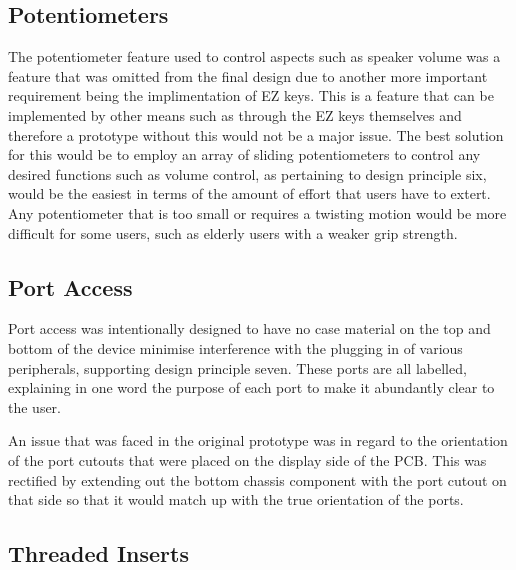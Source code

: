 \subsection{Potentiometers}

The potentiometer feature used to control aspects such as speaker volume was a feature that was omitted from the final design due to another more important requirement being the implimentation of EZ keys.
This is a feature that can be implemented by other means such as through the EZ keys themselves and therefore a prototype without this would not be a major issue.
The best solution for this would be to employ an array of sliding potentiometers to control any desired functions such as volume control, as pertaining to design principle six, would be the easiest in terms of the amount of effort that users have to extert.
Any potentiometer that is too small or requires a twisting motion would be more difficult for some users, such as elderly users with a weaker grip strength.

\subsection{Port Access}

Port access was intentionally designed to have no case material on the top and bottom of the device minimise interference with the plugging in of various peripherals, supporting design principle seven.
These ports are all labelled, explaining in one word the purpose of each port to make it abundantly clear to the user.

An issue that was faced in the original prototype was in regard to the orientation of the port cutouts that were placed on the display side of the PCB.
This was rectified by extending out the bottom chassis component with the port cutout on that side so that it would match up with the true orientation of the ports. %

\subsection{Threaded Inserts}

